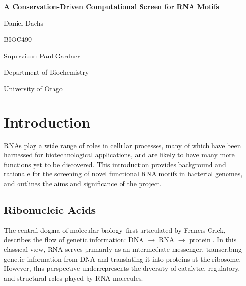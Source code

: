 \documentclass{article}
\begin{document}
\begin{titlepage}
    \centering
    \vspace*{3cm}
    
    {\Huge\bfseries A Conservation-Driven Computational Screen for RNA Motifs\par}
    \vspace{2cm}
    
    {\Large Daniel Dachs\par}
    \vspace{1.5cm}
    
    {\large BIOC490\par}
    \vspace{1cm}
    
    {\large Supervisor: Paul Gardner\par}
    \vspace{1cm}
    
    {\large Department of Biochemistry\par}
    {\large University of Otago\par}
    \vspace{1cm}
    
    \vfill
\end{titlepage}


\section{Introduction}

RNAs play a wide range of roles in cellular processes, many of which have been harnessed for biotechnological applications, and are likely to have many more functions yet to be discovered.
This introduction provides background and rationale for the screening of novel functional RNA motifs in bacterial genomes, and outlines the aims and significance of the project.

\subsection{Ribonucleic Acids}

The central dogma of molecular biology, first articulated by Francis Crick, describes the flow of genetic information: DNA $\rightarrow$ RNA $\rightarrow$ protein \parencite{Crick1970}.
In this classical view, RNA serves primarily as an intermediate messenger, transcribing genetic information from DNA and translating it into proteins at the ribosome.
However, this perspective underrepresents the diversity of catalytic, regulatory, and structural roles played by RNA molecules.
\end{document}
